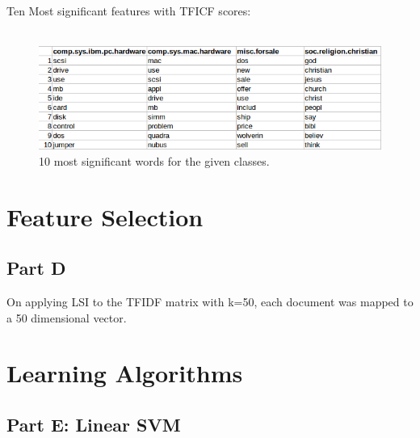 \documentclass[11pt]{article}
\begin{document}
Ten Most significant features with TFICF 
scores:\\
\\


\begin{figure}[H]
	
	\includegraphics[width=\textwidth]{Table2.png}
	\caption{10 most significant words for the given classes.}
\end{figure}

\section{Feature Selection}
\subsection{Part D}
On applying LSI to the TFIDF matrix with k=50, each document was mapped to a 50 dimensional vector. 

\section{Learning Algorithms}
\subsection{Part E: Linear SVM}
\end{document}
